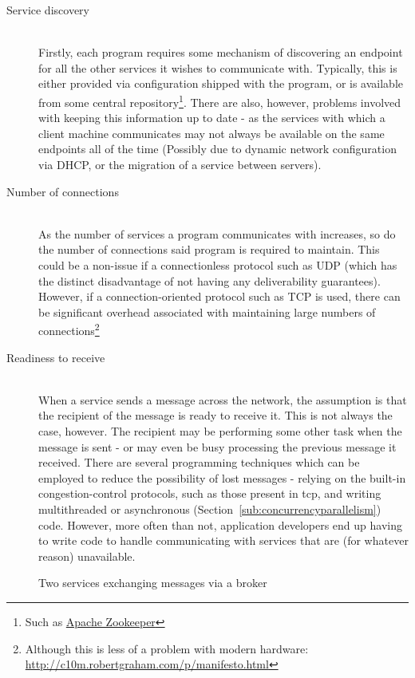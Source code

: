 \begin{description}
  \item[Service discovery] \hfill \\ Firstly, each program requires some
  mechanism of discovering an endpoint for all the other services it wishes to
  communicate with. Typically, this is either provided via configuration shipped
  with the program, or is available from some central repository\footnote{Such
  as \href{https://zookeeper.apache.org/}{Apache Zookeeper}}. There are also,
  however, problems involved with keeping this information up to date - as the
  services with which a client machine communicates may not always be available
  on the same endpoints all of the time (Possibly due to dynamic network
  configuration via DHCP, or the migration of a service between servers).
  \item[Number of connections] \hfill \\
  As the number of services a program communicates with increases, so do the
  number of connections said program is required to maintain. This could be a
  non-issue if a connectionless protocol such as UDP (which has the distinct
  disadvantage of not having any deliverability guarantees). However, if a
  connection-oriented protocol such as TCP is used, there can be significant
  overhead associated with maintaining large numbers of
  connections\footnote{Although this is less of a problem with modern hardware:
  \url{http://c10m.robertgraham.com/p/manifesto.html}}
  \item[Readiness to receive] \hfill \\ When a service sends a message across
  the network, the assumption is that the recipient of the message is ready to
  receive it.  This is not always the case, however. The recipient may be
  performing some other task when the message is sent - or may even be busy
  processing the previous message it received. There are several programming
  techniques which can be employed to reduce the possibility of lost messages -
  relying on  the built-in congestion-control protocols, such as those present
  in \gls{tcp}\cite{rfc2581}, and writing multithreaded or asynchronous
  (Section~\ref{sub:concurrencyparallelism}) code. However, more often than not,
  application developers end up having to write code to handle communicating
  with services that are (for whatever reason) unavailable.
\end{description}

\begin{figure}[htbp]
  \centering
  
  \caption{Two services exchanging messages via a broker}
  \label{fig:tikz:messageBroker}
\end{figure}

